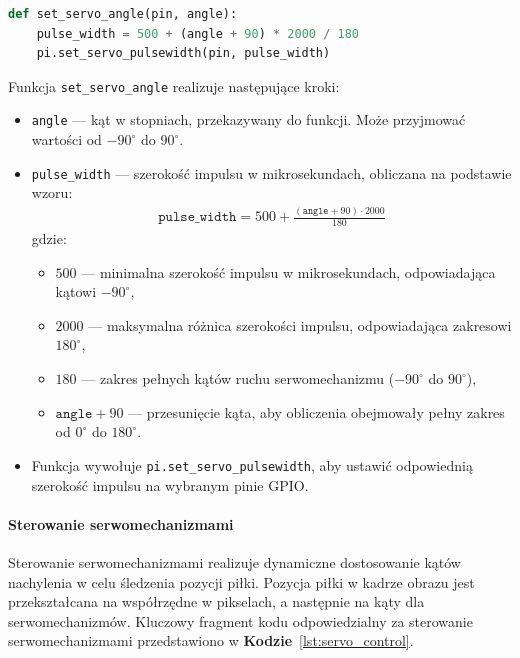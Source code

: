 \documentclass[a4paper,twoside,12pt]{book}
\begin{document}
\begin{lstlisting}[language=Python, caption={Przeliczanie kąta na szerokość impulsu.}, label={lst:set_servo_angle}, captionpos=b]
def set_servo_angle(pin, angle):
    pulse_width = 500 + (angle + 90) * 2000 / 180
    pi.set_servo_pulsewidth(pin, pulse_width)
\end{lstlisting}

\newpage
Funkcja \texttt{set\_servo\_angle} realizuje następujące kroki:
\begin{itemize}
    \item \texttt{angle} — kąt w stopniach, przekazywany do funkcji. Może przyjmować wartości od $-90^{\circ}$ do $90^{\circ}$.
    \item \texttt{pulse\_width} — szerokość impulsu w mikrosekundach, obliczana na podstawie wzoru:
    \begin{align}
    \texttt{pulse\_width} = 500 + \frac{(\texttt{angle} + 90) \cdot 2000}{180}
    \end{align}
    gdzie:
    \begin{itemize}
        \item $500$ — minimalna szerokość impulsu w mikrosekundach, odpowiadająca kątowi $-90^{\circ}$,
        \item $2000$ — maksymalna różnica szerokości impulsu, odpowiadająca zakresowi $180^{\circ}$,
        \item $180$ — zakres pełnych kątów ruchu serwomechanizmu ($-90^{\circ}$ do $90^{\circ}$),
        \item $\texttt{angle} + 90$ — przesunięcie kąta, aby obliczenia obejmowały pełny zakres od $0^{\circ}$ do $180^{\circ}$.
    \end{itemize}
    \item Funkcja wywołuje \texttt{pi.set\_servo\_pulsewidth}, aby ustawić odpowiednią szerokość impulsu na wybranym pinie GPIO.
\end{itemize}

\paragraph{Sterowanie serwomechanizmami}
Sterowanie serwomechanizmami realizuje dynamiczne dostosowanie kątów nachylenia w celu śledzenia pozycji piłki. Pozycja piłki w kadrze obrazu jest przekształcana na współrzędne w pikselach, a następnie na kąty dla serwomechanizmów. Kluczowy fragment kodu odpowiedzialny za sterowanie serwomechanizmami przedstawiono w \textbf{Kodzie}~\ref{lst:servo_control}.
\end{document}
